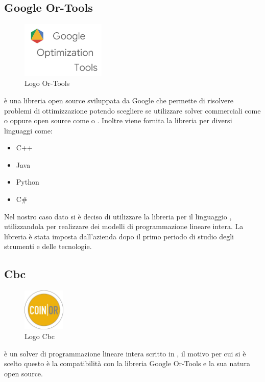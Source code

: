 \subsection{Google Or-Tools}
\begin{figure}[H]
	\begin{center} \includegraphics[width=4cm]{figures/google_or_tools}
		\caption[Logo Or-Tools]{Logo Or-Tools}  
	\end{center}
\end{figure}
 è una libreria open source sviluppata da Google che permette di risolvere problemi di ottimizzazione potendo scegliere se utilizzare solver commerciali come  o  oppure open source come  o . Inoltre viene fornita la libreria per diversi linguaggi come:
\begin{itemize}
	\item C++
	\item Java
	\item Python
	\item C\#
\end{itemize}
Nel nostro caso dato si è deciso di utilizzare la libreria per il linguaggio , utilizzandola per realizzare dei modelli di programmazione lineare intera. La libreria è stata imposta dall'azienda dopo il primo periodo di studio degli strumenti e delle tecnologie.

\subsection{Cbc}

\begin{figure}[H]
	\begin{center} \includegraphics[width=2cm]{figures/coin_banner}
		\caption[Logo Cbc]{Logo Cbc}  
	\end{center}
\end{figure}
 è un solver di programmazione lineare intera scritto in , il motivo per cui si è scelto questo è la compatibilità con la libreria Google Or-Tools e la sua natura open source.


